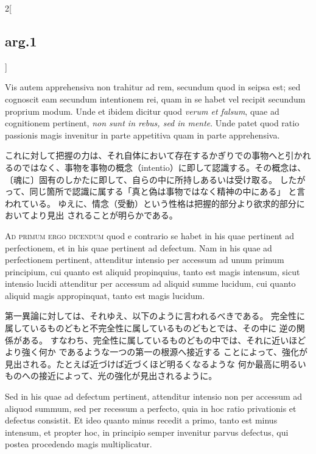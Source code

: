 \documentclass[paper=a4paper,fontsize=10pt,jafontsize=9pt,titlepage]{jlreq}
\begin{document}
\begin{paracol}{2}[\subsection{arg.1}]
\switchcolumn*

Vis autem apprehensiva non trahitur ad rem, secundum quod
 in seipsa est; sed cognoscit eam secundum intentionem rei, quam in se
 habet vel recipit secundum proprium modum. Unde et ibidem dicitur quod
 {\itshape verum et falsum}, quae ad cognitionem pertinent, {\itshape non sunt in rebus, sed
 in mente}. Unde patet quod ratio passionis magis invenitur in parte
 appetitiva quam in parte apprehensiva.

\switchcolumn

これに対して把握の力は、それ自体において存在するかぎりでの事物へと引かれ
 るのではなく、事物を事物の概念（intentio）に即して認識する。その概念は、
 〔魂に〕固有のしかたに即して、自らの中に所持しあるいは受け取る。
したがって、同じ箇所で認識に属する「真と偽は事物ではなく精神の中にある」
 と言われている。
ゆえに、情念（受動）という性格は把握的部分より欲求的部分においてより見出
 されることが明らかである。

\switchcolumn*[\subsection{ad.1}]

{\scshape Ad primum ergo dicendum} quod e contrario se habet in his quae pertinent
 ad perfectionem, et in his quae pertinent ad defectum. Nam in his quae
 ad perfectionem pertinent, attenditur intensio per accessum ad unum
 primum principium, cui quanto est aliquid propinquius, tanto est magis
 intensum, sicut intensio lucidi attenditur per accessum ad aliquid
 summe lucidum, cui quanto aliquid magis appropinquat, tanto est magis
 lucidum.

\switchcolumn

第一異論に対しては、それゆえ、以下のように言われるべきである。
完全性に属しているものどもと不完全性に属しているものどもとでは、その中に
 逆の関係がある。
すなわち、完全性に属しているものどもの中では、それに近いほどより強く何か
 であるような一つの第一の根源へ接近する
ことによって、強化が見出される。たとえば近づけば近づくほど明るくなるような
 何か最高に明るいものへの接近によって、光の強化が見出されるように。

\switchcolumn*

Sed in his quae ad defectum pertinent, attenditur intensio non
 per accessum ad aliquod summum, sed per recessum a perfecto, quia in
 hoc ratio privationis et defectus consistit. Et ideo quanto minus
 recedit a primo, tanto est minus intensum, et propter hoc, in principio
 semper invenitur parvus defectus, qui postea procedendo magis
 multiplicatur.


\end{paracol}
\end{document}
